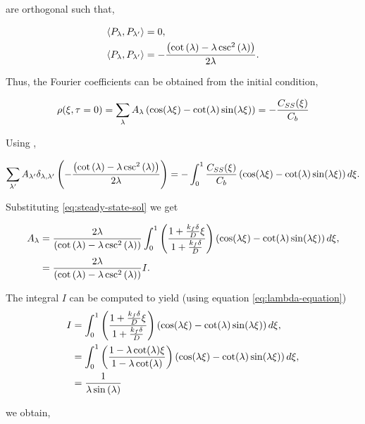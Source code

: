 are orthogonal such that,

\begin{align}
	\left< P_\lambda , P_{\lambda'}\right> &= 0, \\
	\left< P_\lambda , P_{\lambda'}\right> &= -\frac{\left({\cot\left({\lambda}\right) -  \lambda \csc^2\left({\lambda}\right)}\right)}{2\lambda}.
\end{align}

Thus, the Fourier coefficients can be obtained from the initial condition,
 

\begin{align}
	\rho(\xi,\tau = 0) = \sum_\lambda A_\lambda \left({  \cos(\lambda\xi) - \cot(\lambda)\sin(\lambda\xi)}\right) = -\frac{C_{SS}(\xi)}{C_b}
\end{align}


Using \label{eq:orthogonality}, 

\begin{align}
\sum_{\lambda'} A_{\lambda'} \delta_{\lambda, \lambda'}\left({-\frac{\left({\cot\left({\lambda}\right) -  \lambda \csc^2\left({\lambda}\right)}\right)}{2\lambda} }\right)= -\int_0^1 \frac{C_{SS}(\xi)}{C_b}\left({\cos(\lambda \xi) - \cot(\lambda) \sin(\lambda\xi)}\right)d\xi.
\end{align}




Substituting \ref{eq:steady-state-sol} we get

\begin{align}
A_{\lambda} &= \frac{2\lambda}{\left({\cot\left({\lambda}\right) -  \lambda \csc^2\left({\lambda}\right)}\right)}\int_0^1 \left({\frac{1+\frac{k_f\delta}{D}\xi}{1+\frac{k_f\delta}{D}}}\right)\left({\cos(\lambda \xi) - \cot(\lambda) \sin(\lambda\xi)}\right)d\xi,\\
&= \frac{2\lambda}{\left({\cot\left({\lambda}\right) -  \lambda \csc^2\left({\lambda}\right)}\right)}I.
\end{align}

  
The integral $I$ can be computed to yield (using equation \ref{eq:lambda-equation})
\begin{align}
I &= \int_0^1 \left({\frac{1+\frac{k_f\delta}{D}\xi}{1+\frac{k_f\delta}{D}}}\right)\left({\cos(\lambda \xi) - \cot(\lambda) \sin(\lambda\xi)}\right)d\xi,\\
&= \int_0^1 \left({\frac{1-\lambda \cot(\lambda)\xi}{1-\lambda \cot(\lambda)}}\right)\left({\cos(\lambda \xi) - \cot(\lambda) \sin(\lambda\xi)}\right)d\xi,\\
&= \frac{1}{\lambda\sin\left({\lambda}\right)}	
\end{align}

 we obtain,



